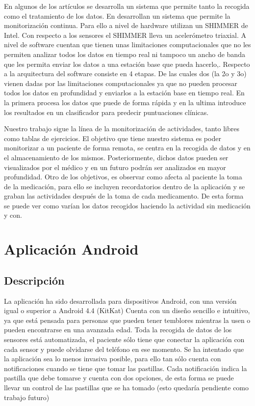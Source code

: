 \documentclass[11pt,spanish]{article}
\begin{document}
En algunos de los artículos se desarrolla un sistema que permite tanto la recogida como el tratamiento de los datos. En \cite{resumen1} desarrollan un sistema que permite la monitorización continua. Para ello a nivel de hardware utilizan un SHIMMER de Intel. Con respecto a los sensores el SHIMMER lleva un acelerómetro triaxial. A nivel de software cuentan que tienen unas limitaciones computacionales que no les permiten analizar todos los datos en tiempo real ni tampoco un ancho de banda que les permita enviar los datos a una estación base que pueda hacerlo,. Respecto a la arquitectura del software consiste en 4 etapas. De las cuales dos (la 2o y 3o) vienen dadas por las limitaciones computacionales ya que no pueden procesar todos los
datos en profundidad y enviarlos a la estación base en tiempo real. En la primera procesa los datos que puede de forma rápida y en la ultima introduce los resultados en un clasificador para predecir puntuaciones clínicas.
\newline

Nuestro trabajo sigue la línea de la monitorización de actividades, tanto libres como tablas de ejercicios. El objetivo que tiene nuestro sistema es poder monitorizar a un paciente de forma remota, se centra en la recogida de datos y en el almacenamiento de los mismos. Posteriormente, dichos datos pueden ser visualizados por el médico y en un futuro podrán ser analizados en mayor profundidad. Otro de los objetivos, es observar como afecta al paciente la toma de la medicación, para ello se incluyen recordatorios dentro de la aplicación y se graban las actividades después de la toma de cada medicamento. De esta forma se puede ver como varían los datos recogidos haciendo la actividad sin medicación y con.

\newpage

\section{Aplicación Android}
\subsection{Descripción}
La aplicación ha sido desarrollada para dispositivos Android, con una versión igual o superior a Android 4.4 (KitKat) Cuenta con un diseño sencillo e intuitivo, ya que está pensada para personas que pueden tener temblores mientras la usen o pueden encontrarse en una avanzada edad. Toda la recogida de datos de los sensores está automatizada, el paciente sólo tiene que conectar la aplicación con cada sensor y puede olvidarse del teléfono en ese momento. Se ha intentado que la aplicación sea lo menos invasiva posible, para ello tan sólo cuenta con notificaciones cuando se tiene que tomar las pastillas. Cada notificación indica la pastilla que debe tomarse y cuenta con dos opciones, de esta forma se puede llevar un control de las pastillas que se ha tomado (esto quedaría pendiente como trabajo futuro)
\newline
\end{document}
